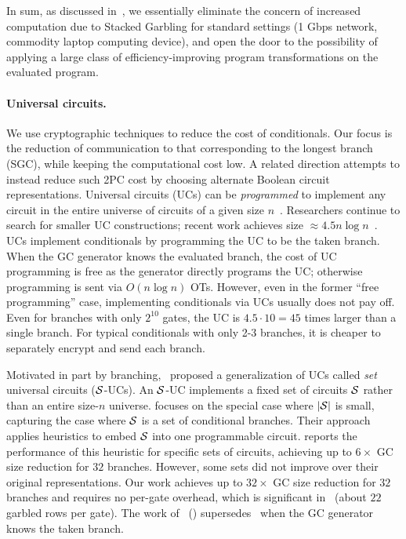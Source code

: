 In sum, as discussed in~, we essentially eliminate the concern of increased computation due to Stacked Garbling for standard settings (1 Gbps network, commodity laptop computing device), and open the door to the possibility of applying a large class of efficiency-improving program transformations on the evaluated program.





 
 
 
\paragraph{Universal circuits.}
We use cryptographic techniques to reduce the cost of conditionals.  Our focus is the reduction of communication to that corresponding to the longest branch (SGC), while keeping the computational cost low.
A related direction attempts to instead reduce such 2PC cost by choosing alternate Boolean circuit representations.
Universal circuits (UCs) can be \emph{programmed} to implement any circuit in the entire universe of circuits of a given size $n$~\cite{STOC:Valiant76}.
Researchers continue to search for smaller UC constructions;
recent work achieves size $\approx 4.5 n \log n$~\cite{EPRINT:LipMohSad16,EC:KisSch16,AC:GunKisSch17,EPRINT:ZYZL19,EPRINT:AGKS19}.
%
UCs implement conditionals by programming the UC to be the taken branch. 
When the GC generator knows the evaluated branch, the cost of UC programming is free as the generator directly programs the UC; otherwise programming is sent via $O(n\log n)$ OTs.
However, even in the former ``free programming'' case, 
implementing conditionals via UCs usually does not pay off.
Even for branches with only $2^{10}$ gates, the UC is $4.5 \cdot 10 = 45$ times larger than a single branch. 
For typical conditionals with only 2-3 branches, it is cheaper to separately encrypt and send each branch. 

Motivated in part by branching,~\cite{AC:KenKolWil17} proposed a generalization of UCs called \emph{set} universal circuits ($\cal S$-UCs).
An $\cal S$-UC implements a fixed set of circuits $\cal S$ rather than an entire size-$n$ universe.
\cite{AC:KenKolWil17} focuses on the special case where $|\cal S|$ is small, capturing the case where $\cal S$ is a set of conditional branches.
Their approach applies heuristics to embed $\cal S$ into one programmable circuit.
\cite{AC:KenKolWil17} reports the performance of this heuristic for specific sets of circuits, achieving up to $6\times$ GC size reduction for $32$ branches.
However, some sets did not improve over their original representations.  Our work achieves up to $32\times$ GC size reduction for $32$ branches and requires no per-gate overhead, which is significant  in~\cite{AC:KenKolWil17} (about $22$ garbled rows per gate).  
The work of~\cite{AC:Kolesnikov18} () supersedes~\cite{AC:KenKolWil17} when the GC generator knows the taken branch. 



